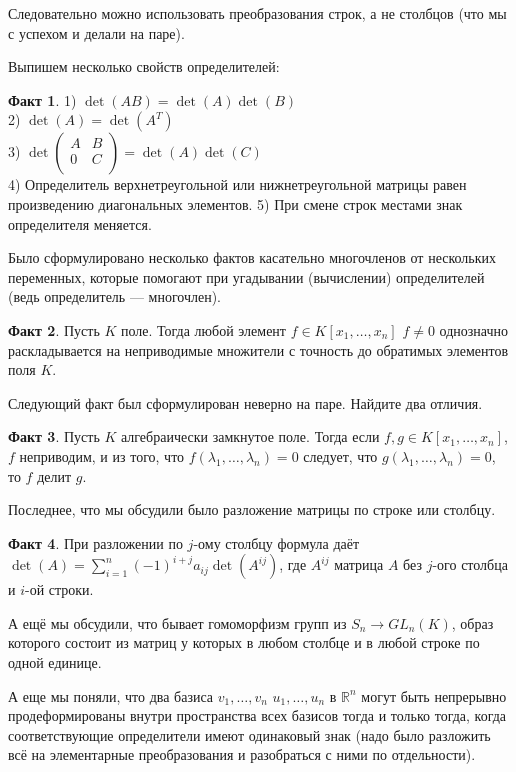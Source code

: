 \documentclass[10pt,a4paper,oneside]{book}
\theoremstyle{definition}
\newtheorem*{fact}{Факт}
\newcommand{\mb}[1]{\mathbb{#1}}
\begin{document}
Следовательно можно использовать преобразования строк, а не столбцов (что мы с успехом и делали на паре).

Выпишем несколько свойств определителей:

\begin{fact}
1) $\det(AB)=\det(A)\det(B)$\\
2) $\det(A)=\det(A^{T})$\\
3) $\det \left(\begin{matrix}A & B\\
0 & C \\
\end{matrix}\right)= \det(A)\det(C)$\\
4) Определитель верхнетреугольной или нижнетреугольной матрицы равен произведению диагональных элементов. 
5) При смене строк местами знак определителя меняется.
\end{fact}


Было сформулировано несколько фактов касательно многочленов от нескольких переменных, которые помогают при угадывании (вычислении) определителей (ведь определитель --- многочлен).
\begin{fact}
Пусть $K$ поле. Тогда любой элемент  $f\in K[x_1,\dots,x_n]$  $f\neq 0$ однозначно раскладывается на неприводимые множители с точность до обратимых элементов поля $K$.
\end{fact}

Следующий факт был сформулирован неверно на паре. Найдите два отличия.

\begin{fact}
Пусть $K$ алгебраически замкнутое поле. Тогда если  $f,g\in K[x_1,\dots,x_n]$, $f$ неприводим, и из того, что $f(\lambda_1,\dots, \lambda_n)=0$ следует, что $g(\lambda_1,\dots, \lambda_n)=0$, то $f$ делит $g$.
\end{fact}


Последнее, что мы обсудили было разложение матрицы по строке или столбцу.

\begin{fact} При разложении по $j$-ому столбцу формула даёт $\det(A)=\sum_{i=1}^n (-1)^{i+j} a_{ij}\det( A^{ij})$, где $A^{ij}$ матрица $A$ без $j$-ого столбца и $i$-ой строки.
\end{fact}



А ещё мы обсудили, что бывает гомоморфизм групп из $S_n\to GL_n(K)$, образ которого состоит из матриц у которых в любом столбце и в любой строке по одной единице.

А еще мы поняли, что два базиса $v_1,\dots, v_n$ $u_1,\dots, u_n$ в $\mb R^n$ могут быть непрерывно продеформированы внутри пространства всех базисов тогда и только тогда, когда соответствующие определители имеют одинаковый знак (надо было разложить всё на элементарные преобразования и разобраться с ними по отдельности).
\end{document}
